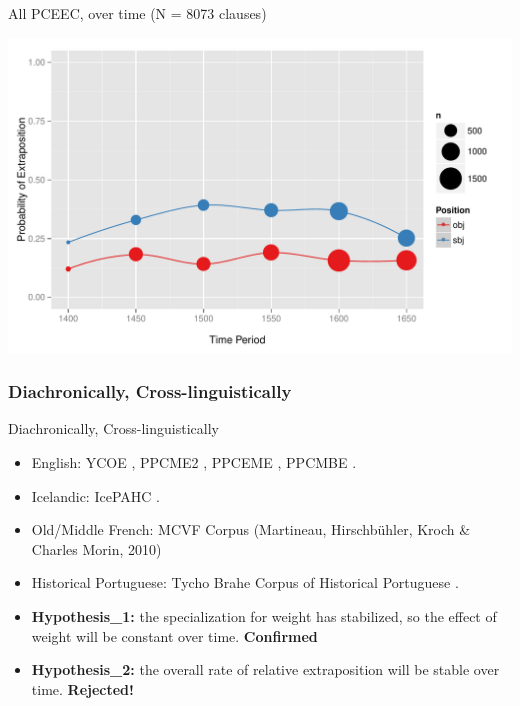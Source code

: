 \documentclass[hyperref={pdfpagelabels=false}]{beamer}
\begin{document}
\begin{frame}{All PCEEC, over time (N = 8073 clauses)}

\begin{center}
\includegraphics[width=1.1\textwidth]{exSbjObjYearBinned50.pdf}
\end{center}
\end{frame}


\subsubsection{Diachronically, Cross-linguistically}

\begin{frame}{Diachronically, Cross-linguistically}
\begin{itemize}
	\item English: YCOE \citep{ycoe}, PPCME2 \citep{ppcme2}, PPCEME \citep{ppceme}, PPCMBE \citep{ppcmbe}.
	\item Icelandic: IcePAHC \citep{icepahc09}.
	\item Old/Middle French: MCVF Corpus (Martineau, Hirschbühler, Kroch \& Charles Morin, 2010) \nocite{mcvf}
	\item Historical Portuguese: Tycho Brahe Corpus of Historical Portuguese \citep{tychobrahe}.
	\item \textbf{Hypothesis_1:} the specialization for weight has stabilized, so the effect of weight will be constant over time. \textbf{Confirmed}
	\item \textbf{Hypothesis_2:} the overall rate of relative extraposition will be stable over time. \textbf{Rejected!}
\end{itemize}
\end{frame}
\end{document}
